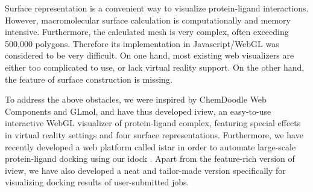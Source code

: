 \documentclass{bioinfo}
\begin{document}
Surface representation is a convenient way to visualize protein-ligand interactions. However, macromolecular surface calculation is computationally and memory intensive. Furthermore, the calculated mesh is very complex, often exceeding 500,000 polygons. Therefore its implementation in Javascript/WebGL was considered to be very difficult. On one hand, most existing web visualizers are either too complicated to use, or lack virtual reality support. On the other hand, the feature of surface construction is missing.

To address the above obstacles, we were inspired by ChemDoodle Web Components and GLmol, and have thus developed iview, an easy-to-use interactive WebGL visualizer of protein-ligand complex, featuring special effects in virtual reality settings and four surface representations. Furthermore, we have recently developed a web platform called istar in order to automate large-scale protein-ligand docking using our idock \citep{1153}. Apart from the feature-rich version of iview, we have also developed a neat and tailor-made version specifically for visualizing docking results of user-submitted jobs.

\end{document}
